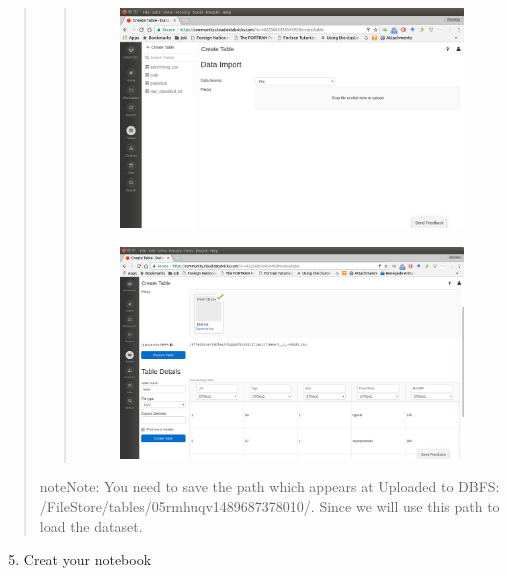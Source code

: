 \documentclass[letterpaper,11pt,english]{sphinxmanual}
\begin{document}
\begin{quote}
\begin{enumerate}
\end{enumerate}
\begin{quote}
\begin{figure}[htbp]
\centering

\includegraphics{table.png}
\label{setup:fig-table}\end{figure}
\begin{figure}[htbp]
\centering

\includegraphics{dataset1.png}
\label{setup:fig-dataset1}\end{figure}
\end{quote}

\begin{notice}{note}{Note:}
You need to save the path which appears at Uploaded to DBFS:
/FileStore/tables/05rmhuqv1489687378010/. Since we will use
this path to load the dataset.
\end{notice}
\end{quote}
\begin{enumerate}
\setcounter{enumi}{4}
\item {} 
Creat your notebook

\end{enumerate}
\end{document}
